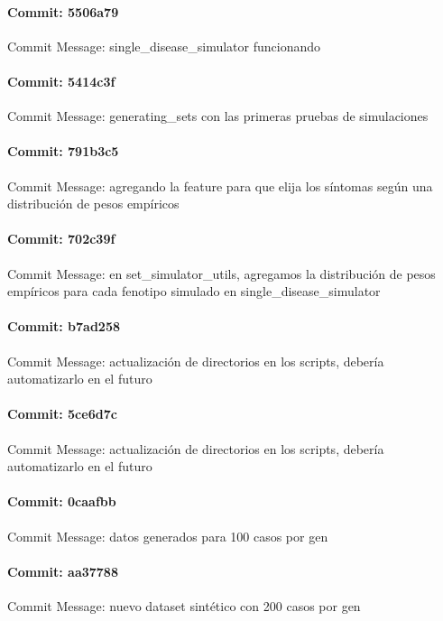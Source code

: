 \documentclass{article}
\begin{document}
\paragraph{Commit: 5506a79}
Commit Message: single_disease_simulator funcionando

\paragraph{Commit: 5414c3f}
Commit Message: generating_sets con las primeras pruebas de simulaciones

\paragraph{Commit: 791b3c5}
Commit Message: agregando la feature para que elija los síntomas según una distribución de pesos empíricos

\paragraph{Commit: 702c39f}
Commit Message: en set_simulator_utils, agregamos la distribución de pesos empíricos para cada fenotipo simulado en single_disease_simulator

\paragraph{Commit: b7ad258}
Commit Message: actualización de directorios en los scripts, debería automatizarlo en el futuro

\paragraph{Commit: 5ce6d7c}
Commit Message: actualización de directorios en los scripts, debería automatizarlo en el futuro

\paragraph{Commit: 0caafbb}
Commit Message: datos generados para 100 casos por gen

\paragraph{Commit: aa37788}
Commit Message: nuevo dataset sintético con 200 casos por gen

\end{document}
